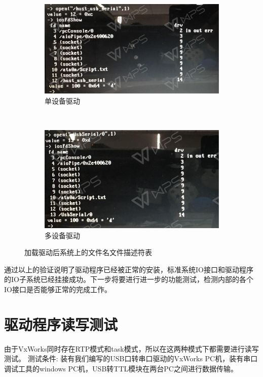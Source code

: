 \begin{figure}[h]
\centering
  \begin{subfigure}[b]{0.4\textwidth}
  \includegraphics[width=\textwidth]{./graphics/iosFdShowS.pdf}
  \caption{单设备驱动}
  \end{subfigure}
  ~
  \begin{subfigure}[b]{0.4\textwidth}
  \includegraphics[width=\textwidth]{./graphics/iosFdShowM.pdf}
  \caption{多设备驱动}
  \end{subfigure}
\caption{加载驱动后系统上的文件名文件描述符表}\label{fig:加载驱动后系统上的文件描述符表}
\end{figure}

通过以上的验证说明了驱动程序已经被正常的安装，标准系统IO接口和驱动程序的IO子系统已经挂接成功。下一步将要进行进一步的功能测试，检测内部的各个IO接口是否能够正常的完成工作。
	
\section{驱动程序读写测试}
	由于VxWorks同时存在RTP模式和task模式，所以在这两种模式下都需要进行读写测试。
测试条件: 装有我们编写的USB口转串口驱动的VxWorks PC机，装有串口调试工具的windows PC机，USB转TTL模块在两台PC之间进行数据传输。

